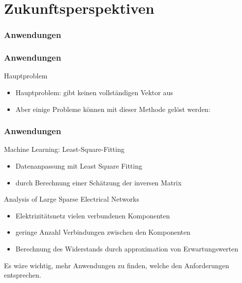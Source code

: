 \section{Zukunftsperspektiven}


\subsubsection{Anwendungen}
\begin{frame}
    \frametitle{Anwendungen}

    Hauptproblem
    \begin{itemize}
        \item Hauptproblem: gibt keinen vollständigen Vektor aus
        \item Aber einige Probleme können mit dieser Methode gelöst werden:
    \end{itemize}
    
\end{frame}

\begin{frame}
    \frametitle{Anwendungen}

    Machine Learning: Least-Square-Fitting
    \begin{itemize}
        \item Datenanpassung mit Least Square Fitting
        \item durch Berechnung einer Schätzung der inversen Matrix
    \end{itemize}

   \hfil


    Analysis of Large Sparse Electrical Networks 
    \begin{itemize}
        \item Elektrizitätsnetz vielen verbundenen Komponenten 
        \item geringe Anzahl Verbindungen zwischen den Komponenten
        \item Berechnung des Widerstands durch approximation von Erwartungswerten
    \end{itemize} 

   \hfil
   
    Es wäre wichtig, mehr Anwendungen zu finden, welche den Anforderungen entsprechen. 
\end{frame}

